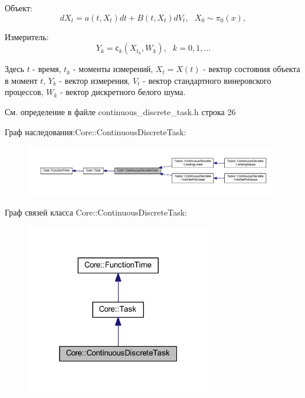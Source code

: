 \begin{DoxyItemize}
\item Объект\+: \[dX_t = a(t, X_t)dt + B(t, X_t)dV_t,\ \ \ X_0 \sim \pi_0(x),\]
\item Измеритель\+: \[Y_k = с_k(X_{t_k}, W_k),\ \ \ k = 0, 1, \ldots\]
\end{DoxyItemize}

Здесь $t$ -\/ время, $t_k$ -\/ моменты измерений, $X_t = X(t)$ -\/ вектор состояния объекта в момент $t$, $Y_k$ -\/ вектор измерения, $V_t$ -\/ вектор стандартного винеровского процессов, $W_k$ -\/ вектор дискретного белого шума. 

См. определение в файле continuous\+\_\+discrete\+\_\+task.\+h строка 26



Граф наследования\+:Core\+:\+:Continuous\+Discrete\+Task\+:
\nopagebreak
\begin{figure}[H]
\begin{center}
\leavevmode
\includegraphics[width=350pt]{class_core_1_1_continuous_discrete_task__inherit__graph}
\end{center}
\end{figure}


Граф связей класса Core\+:\+:Continuous\+Discrete\+Task\+:
\nopagebreak
\begin{figure}[H]
\begin{center}
\leavevmode
\includegraphics[width=229pt]{class_core_1_1_continuous_discrete_task__coll__graph}
\end{center}
\end{figure}


